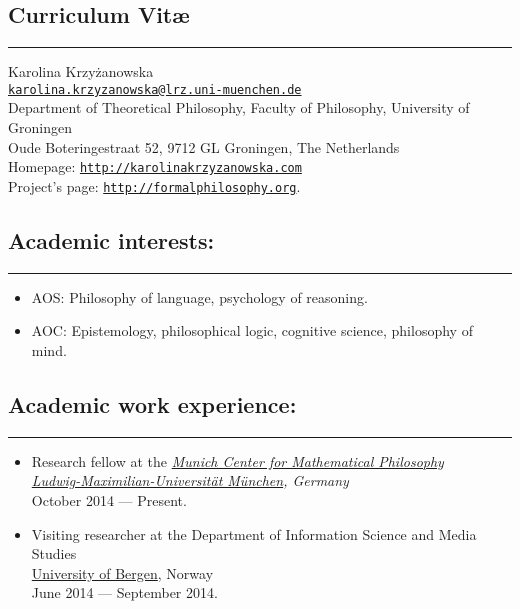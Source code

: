 \documentclass[a4paper,12pt]{article}
\begin{document}
\newcommand{\headone}[1] {
 \section*{#1}
\rule[2.5ex]{\textwidth}{2pt}}

\newcommand{\headtwo}[1]{
  \subsection*{#1}
  \rule[1.5ex]{\textwidth}{.5pt}}

\newcommand{\headthree}[1]{ {\large #1}}

\newcommand{\link}[1]{ \texttt{\href{#1}{#1}}}

\begin{small}

  \headone{Curriculum Vit\ae}
  
  Karolina Krzyżanowska\\
  \href{mailto:karolina.krzyzanowska@lrz.uni-muenchen.de}{\texttt{karolina.krzyzanowska@lrz.uni-muenchen.de}}\\
  Department of Theoretical Philosophy, Faculty of Philosophy, University of Groningen\\
  Oude Boteringestraat 52, 9712 GL Groningen, The Netherlands\\
  Homepage: \href{http://karolinakrzyzanowska.com}{\texttt{http://karolinakrzyzanowska.com}}\\
  Project's page:
  \href{http://formalphilosophy.org}{\texttt{http://formalphilosophy.org}}.

  
  \headtwo{Academic interests:}
  \begin{itemize}
  \item AOS: Philosophy of language, psychology of reasoning.
  \item AOC: Epistemology, philosophical logic, cognitive science,
    philosophy of mind.
  \end{itemize}
  
  \headtwo{Academic work experience:}
  \begin{itemize}
\item Research fellow at the \emph{\href{http://www.mcmp.philosophie.uni-muenchen.de/}{Munich Center for Mathematical Philosophy}}\\
\emph{\href{http://www.en.uni-muenchen.de/}{Ludwig-Maximilian-Universität München}, Germany}\\
October 2014 --- Present.

\item Visiting researcher 
at the Department of Information Science and Media Studies\\ 
\href{http://www.uib.no/en}{University of Bergen}, Norway\\
June 2014 --- September 2014.


\end{itemize}
\end{small}
\end{document}
